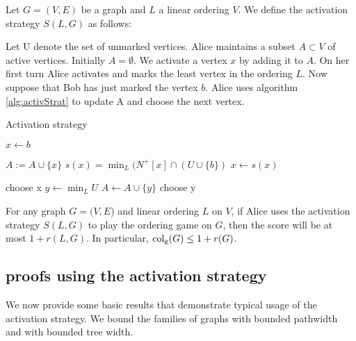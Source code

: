 \begin{definition} 
    Let $G=(V, E)$ be a graph and $L$ a linear ordering $V$. We define the activation strategy $S(L,G)$ as follows:
    
    Let U denote the set of unmarked vertices. Alice maintains a subset $A \subset V$ of active vertices. Initially $A = \emptyset$. We activate a vertex $x$ by adding it to $A$. On her first turn Alice activates and marks the least vertex in the ordering $L$. Now suppose that Bob has just marked the vertex $b$. Alice uses algorithm \ref{alg:activStrat} to update A and choose the
    next vertex.
    \begin{algorithm}[h]
        \caption{Activation strategy}
        \label{alg:activStrat}
        \begin{algorithmic}[1]
            \Statex
            \State $x \gets b$ 
            
                \State $A := A \cup \{x\}$
                \State $s(x) =\min_L(N^+[x] \cap (U \cup \{b\} )$
                \State $x \gets s(x)$
            \EndWhile      
            
                \State choose x
            \Else
                \State $y \gets \min_L U$
                    \State $A \gets A \cup \{y\}$                    
                \EndIf     
                \State choose y
            \EndIf   
        \end{algorithmic}
    \end{algorithm}
    
\end{definition}


\begin{theorem} \label{thm_KIERSTEAD1}
    For any graph $G=(V, E$) and linear ordering $L$ on $V$, if Alice uses the activation strategy $S(L, G)$ to play the ordering game on $G$, then the score will be at most $1+r(L, G)$. In particular, $\operatorname{col_g}(G) \leq 1+r(G)$.
\end{theorem}



\subsection{proofs using the activation strategy}
We now provide some basic results that demonstrate typical usage of the activation strategy. We bound the families of graphs with bounded pathwidth and with bounded tree width.

